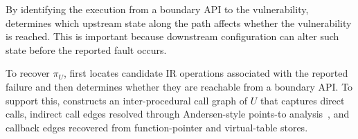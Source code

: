 \begin{center}
    \setlength{\fboxsep}{0.4em}
    \noindent{}
\end{center}

By identifying the execution from a boundary API to the vulnerability, \sys determines which upstream state along the path affects whether the vulnerability is reached. This is important because downstream configuration can alter such state before the reported fault occurs.




To recover $\pi_U$, \sys first locates candidate IR operations associated with the reported failure and then determines whether they are reachable from a boundary API. To support this, \sys constructs an inter-procedural call graph of $U$ that captures direct calls, indirect call edges resolved through Andersen-style points-to analysis~\cite{sui2016svf}, and callback edges recovered from function-pointer and virtual-table stores. 





